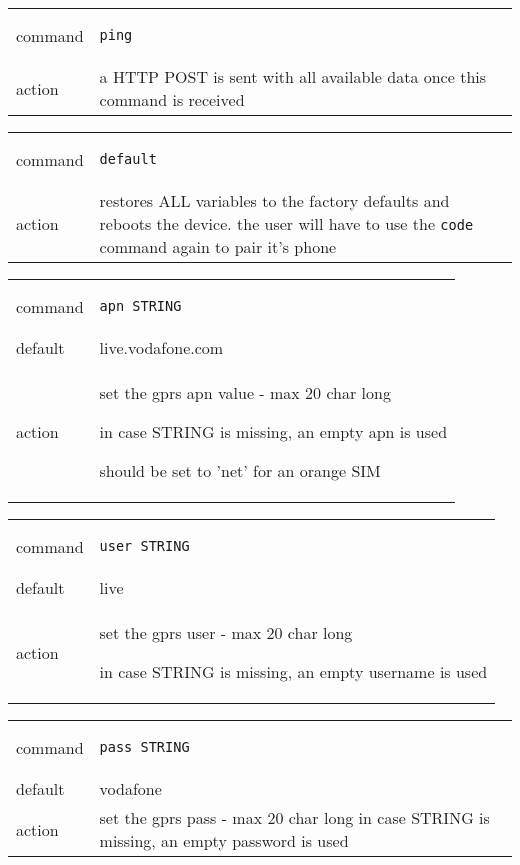 \documentclass[a4paper,twoside]{refart}
\begin{document}
\begin{tabular}{ |l|p{8cm}| }
    \hline
        command & 
\begin{lstlisting}
ping
\end{lstlisting} \\
        action & 
a HTTP POST is sent with all available data once this command is received \\ \hline
\end{tabular}

\begin{tabular}{ |l|p{8cm}| }
    \hline
        command & 
\begin{lstlisting}
default
\end{lstlisting} \\
        action & 
restores ALL variables to the factory defaults and reboots the device. the user will have to use the \verb"code" command again to pair it's phone\\ \hline
\end{tabular}


\begin{tabular}{ |l|p{8cm}| }
    \hline
        command & 
\begin{lstlisting}
apn STRING
\end{lstlisting} \\
        default & live.vodafone.com \\
        action & 
set the gprs apn value - max 20 char long

in case STRING is missing, an empty apn is used 

should be set to 'net' for an orange SIM \\ \hline
\end{tabular}


\begin{tabular}{ |l|p{8cm}| }
    \hline
        command & 
\begin{lstlisting}
user STRING
\end{lstlisting} \\
        default & live \\
        action & 
set the gprs user  - max 20 char long

in case STRING is missing, an empty username is used  \\ \hline
\end{tabular}


\begin{tabular}{ |l|p{8cm}| }
    \hline
        command & 
\begin{lstlisting}
pass STRING
\end{lstlisting} \\
        default & vodafone \\
        action & 
set the gprs pass - max 20 char long
in case STRING is missing, an empty password is used  \\ \hline
\end{tabular}
\end{document}

